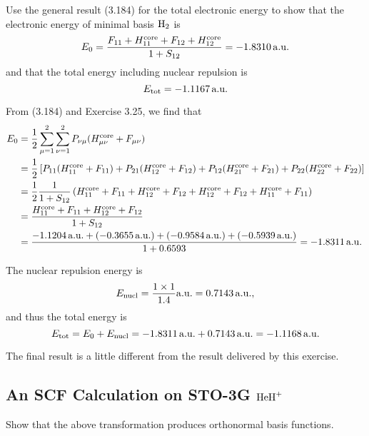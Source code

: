 \documentclass[a4paper]{book}
\newcounter{exercise}[chapter]
\newcounter{solution}[chapter]
\newcommand{\core}{{\rm core}}
\newcommand{\au}{{\rm a.u.}}
\begin{document}
	\begin{exercise}
	Use the general result (3.184) for the total electronic energy to show that the electronic energy of minimal basis $\ce{H2}$ is
	\[
		E_0 = \frac{ F_{11} + H^\core_{11} + F_{12} + H^\core_{12} }{ 1 + S_{12} } = -1.8310 \, \au
	\]
	and that the total energy including nuclear repulsion is
	\[
		E_{\rm tot} = -1.1167 \, \text{a.u.}
	\]
	\end{exercise}
	
	\begin{solution}
	
	From (3.184) and Exercise 3.25, we find that
	\begin{align*}
		E_0 &= \frac{1}{2} \sum_{ \mu=1 }^2 \sum_{ \nu=1 }^2 P_{\nu \mu} ( H^\core_{\mu \nu} + F_{\mu \nu} ) \\
		&= \frac{1}{2} \left[ P_{11} ( H^\core_{11} + F_{11} ) + P_{21} ( H^\core_{12} + F_{12} ) + P_{12} ( H^\core_{21} + F_{21} ) + P_{22} ( H^\core_{22} + F_{22} ) \right] \\
		&= \frac{1}{2} \frac{1}{ 1 + S_{12} } \left( H^\core_{11} + F_{11} + H^\core_{12} + F_{12} + H^\core_{12} + F_{12} + H^\core_{11} + F_{11} \right) \\
		&= \frac{ H^\core_{11} + F_{11} + H^\core_{12} + F_{12} }{ 1 + S_{12} } \\
		&= \frac{ -1.1204 \, \au + ( -0.3655 \, \au ) + ( -0.9584 \, \au ) + ( -0.5939 \, \au ) }{ 1 + 0.6593 } = -1.8311 \, \au
	\end{align*}
	
	The nuclear repulsion energy is
	\[
		E_{\rm nucl} = \frac{ 1 \times 1 }{ 1.4 } \au = 0.7143 \, \au ,
	\]
	and thus the total energy is
	\[
		E_{\rm tot} = E_0 + E_{\rm nucl} = -1.8311 \, \au + 0.7143 \, \au = -1.1168 \, \au
	\]
	
	The final result is a little different from the result delivered by this exercise.
	\end{solution}
	
	\subsection{An SCF Calculation on STO-3G \texorpdfstring{$\ce{HeH+}$}-}
	
	\begin{exercise}
	Show that the above transformation produces orthonormal basis functions.
	\end{exercise}
	
\end{document}
